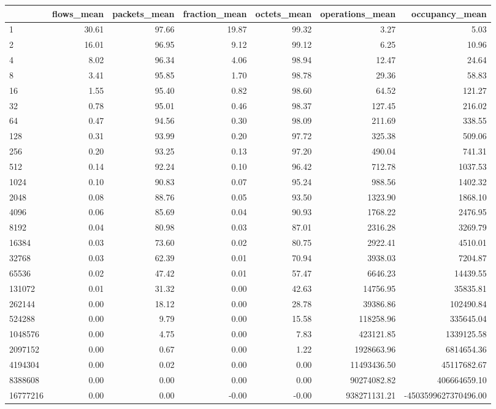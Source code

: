 \begin{tabular}{lrrrrrr}
\toprule
 & flows_mean & packets_mean & fraction_mean & octets_mean & operations_mean & occupancy_mean \\
\midrule
1 & 30.61 & 97.66 & 19.87 & 99.32 & 3.27 & 5.03 \\
2 & 16.01 & 96.95 & 9.12 & 99.12 & 6.25 & 10.96 \\
4 & 8.02 & 96.34 & 4.06 & 98.94 & 12.47 & 24.64 \\
8 & 3.41 & 95.85 & 1.70 & 98.78 & 29.36 & 58.83 \\
16 & 1.55 & 95.40 & 0.82 & 98.60 & 64.52 & 121.27 \\
32 & 0.78 & 95.01 & 0.46 & 98.37 & 127.45 & 216.02 \\
64 & 0.47 & 94.56 & 0.30 & 98.09 & 211.69 & 338.55 \\
128 & 0.31 & 93.99 & 0.20 & 97.72 & 325.38 & 509.06 \\
256 & 0.20 & 93.25 & 0.13 & 97.20 & 490.04 & 741.31 \\
512 & 0.14 & 92.24 & 0.10 & 96.42 & 712.78 & 1037.53 \\
1024 & 0.10 & 90.83 & 0.07 & 95.24 & 988.56 & 1402.32 \\
2048 & 0.08 & 88.76 & 0.05 & 93.50 & 1323.90 & 1868.10 \\
4096 & 0.06 & 85.69 & 0.04 & 90.93 & 1768.22 & 2476.95 \\
8192 & 0.04 & 80.98 & 0.03 & 87.01 & 2316.28 & 3269.79 \\
16384 & 0.03 & 73.60 & 0.02 & 80.75 & 2922.41 & 4510.01 \\
32768 & 0.03 & 62.39 & 0.01 & 70.94 & 3938.03 & 7204.87 \\
65536 & 0.02 & 47.42 & 0.01 & 57.47 & 6646.23 & 14439.55 \\
131072 & 0.01 & 31.32 & 0.00 & 42.63 & 14756.95 & 35835.81 \\
262144 & 0.00 & 18.12 & 0.00 & 28.78 & 39386.86 & 102490.84 \\
524288 & 0.00 & 9.79 & 0.00 & 15.58 & 118258.96 & 335645.04 \\
1048576 & 0.00 & 4.75 & 0.00 & 7.83 & 423121.85 & 1339125.58 \\
2097152 & 0.00 & 0.67 & 0.00 & 1.22 & 1928663.96 & 6814654.36 \\
4194304 & 0.00 & 0.02 & 0.00 & 0.00 & 11493436.50 & 45117682.67 \\
8388608 & 0.00 & 0.00 & 0.00 & 0.00 & 90274082.82 & 406664659.10 \\
16777216 & 0.00 & 0.00 & -0.00 & -0.00 & 938271131.21 & -4503599627370496.00 \\
\bottomrule
\end{tabular}
